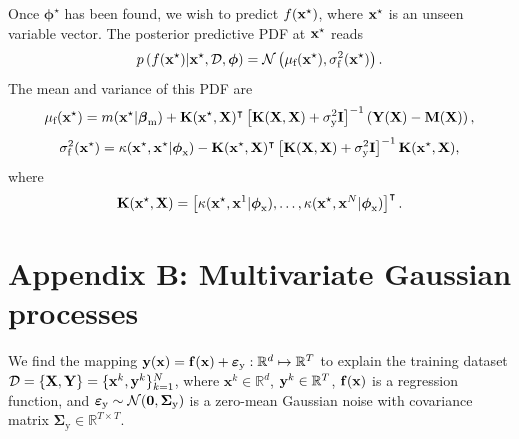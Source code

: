 \documentclass[journal ]{new-aiaa}
\begin{document}
	Once ${\boldsymbol \phi^\star}$ has been found, we wish to predict $f({\bf x}^\star)$, where ${\bf x}^\star$ is an unseen variable vector.
	The posterior predictive PDF at ${\bf x}^\star$ reads
	\begin{equation}\label{eqnA5}
		p\left(f({\bf x}^\star)|{\bf x}^\star,\mathcal{D},\boldsymbol \phi\right) = \mathcal{N}\left(\mu_\text{f}({\bf x}^\star),\sigma_\text{f}^2({\bf x}^\star)\right).
	\end{equation}
	The mean and variance of this PDF are
	\begin{equation}\label{eqnA6}
		\mu_\text{f}({\bf x}^\star)=m({\bf x}^\star|\boldsymbol \beta_{\text{m}}) 
		+ {\bf K}({\bf x}^\star,{\bf X})^\intercal \left[ {\bf K}({\bf X},{\bf X})+\sigma^2_\text{y} {\bf I}\right]^{-1} \left({\bf Y}({\bf X})-{\bf M} ({\bf X})\right),
	\end{equation}
	\begin{equation}\label{eqnA7}
		\sigma_\text{f}^2({\bf x}^\star)=\kappa({\bf x}^\star,{\bf x}^\star|\boldsymbol \phi_{\text{x}})
		-{\bf K}({\bf x}^\star,{\bf X})^\intercal \left[ {\bf K}({\bf X},{\bf X})+\sigma^2_\text{y} {\bf I}\right]^{-1} {\bf K}({\bf x}^\star,{\bf X}),
	\end{equation}
	where
	\begin{equation}\label{eqnA8}
		{\bf K}({\bf x}^\star,{\bf X})= \left[\kappa({\bf x}^\star,{\bf x}^1|\boldsymbol \phi_{\text{x}}),\dots,\kappa({\bf x}^\star,{\bf x}^N|\boldsymbol \phi_{\text{x}})\right]^\intercal.
	\end{equation}
	
	\section*{Appendix B: Multivariate Gaussian processes}\label{AppB}
	\setcounter{equation}{0} %
	\renewcommand{\theequation}{B.\arabic{equation}} %
	
	We find the mapping ${\bf y}({\bf x})={\bf f}({\bf x}) + \boldsymbol{\varepsilon}_\text{y}: \mathbb{R}^d \mapsto \mathbb{R}^T$ to explain the training dataset $\mathcal{D}=\left\{ {\bf X},{\bf Y}\right\}=\{{\bf x}^k,{\bf y}^k\}_{k=1}^N$, where $\textbf{x}^k\in\mathbb{R}^d$, ${\bf y}^k\in\mathbb{R}^T$, ${\bf f}({\bf x})$ is a regression function, and $\boldsymbol{\varepsilon}_\text{y} \sim \mathcal{N}({\bf 0},\boldsymbol{\Sigma}_\text{y})$ is a zero-mean Gaussian noise with covariance matrix $\boldsymbol{\Sigma}_\text{y} \in \mathbb{R}^{T \times T}$.
	
\end{document}
